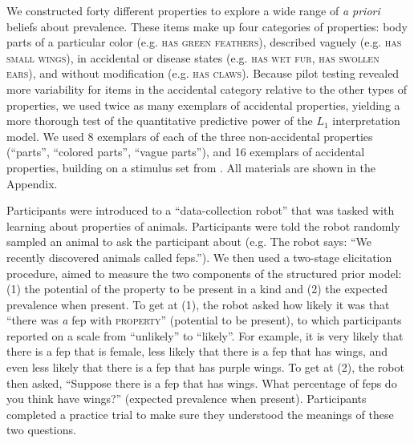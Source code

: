 \documentclass[12pt,letterpaper]{article}
\begin{document}
We constructed forty different properties to explore a wide range of \emph{a priori} beliefs about prevalence. 
These items make up four categories of properties: body parts of a particular color (e.g. \textsc{has green feathers}), described vaguely (e.g. \textsc{has small wings}), in accidental or disease states (e.g. \textsc{has wet fur}, \textsc{has swollen ears}), and without modification (e.g. \textsc{has claws}).
Because pilot testing revealed more variability for items in the accidental category relative to the other types of properties, we used twice as many exemplars of accidental properties, yielding a more thorough test of the quantitative predictive power of the $L_1$ interpretation model. 
We used 8 exemplars of each of the three non-accidental properties (``parts'', ``colored parts'', ``vague parts''), and 16 exemplars of accidental properties, building on a stimulus set from .
All materials are shown in the Appendix.

Participants were introduced to a ``data-collection robot'' that was tasked with learning about properties of animals. 
Participants were told the robot randomly sampled an animal to ask the participant about (e.g. The robot says: ``We recently discovered animals called feps.''). 
We then used a two-stage elicitation procedure, aimed to measure the two components of the structured prior model: (1) the potential of the property to be present in a kind and (2) the expected prevalence when present.
To get at (1), the robot asked how likely it was that ``there was \emph{a} fep with \textsc{property}'' (potential to be present), to which participants reported on a scale from ``unlikely'' to ``likely''.
For example, it is very likely that there is a fep that is female, less likely that there is a fep that has wings, and even less likely that there is a fep that has purple wings. 
To get at (2), the robot then asked, ``Suppose there is a fep that has wings. What percentage of feps do you think have wings?'' (expected prevalence when present). 
Participants completed a practice trial to make sure they understood the meanings of these two questions.
\end{document}
